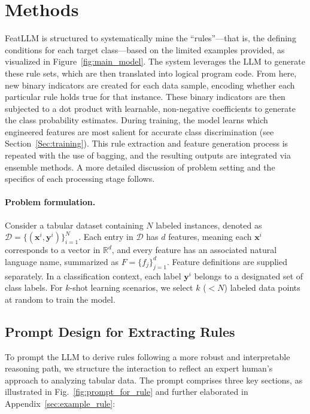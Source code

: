 \section{Methods}
\textsf{FeatLLM} is structured to systematically mine the “rules”—that is, the defining conditions for each target class—based on the limited examples provided, as visualized in Figure~\ref{fig:main_model}. The system leverages the LLM to generate these rule sets, which are then translated into logical program code. From here, new binary indicators are created for each data sample, encoding whether each particular rule holds true for that instance. These binary indicators are then subjected to a dot product with learnable, non-negative coefficients to generate the class probability estimates. During training, the model learns which engineered features are most salient for accurate class discrimination (see Section~\ref{Sec:training}). This rule extraction and feature generation process is repeated with the use of bagging, and the resulting outputs are integrated via ensemble methods. A more detailed discussion of problem setting and the specifics of each processing stage follows.

\vspace*{-0.12in}
\paragraph{Problem formulation.} Consider a tabular dataset containing $N$ labeled instances, denoted as $\mathcal{D} = \{(\mathbf{x}^i, \mathbf{y}^i)\}_{i=1}^{N}$. Each entry in $\mathcal{D}$ has $d$ features, meaning each $\mathbf{x}^i$ corresponds to a vector in $\mathbb{R}^d$, and every feature has an associated natural language name, summarized as $F = \{f_j\}_{j=1}^{d}$. Feature definitions are supplied separately. In a classification context, each label $\mathbf{y}^i$ belongs to a designated set of class labels. For $k$-shot learning scenarios, we select $k$ ($<N$) labeled data points at random to train the model.

\subsection{Prompt Design for Extracting Rules}
\label{Sec:prompt_design}
To prompt the LLM to derive rules following a more robust and interpretable reasoning path, we structure the interaction to reflect an expert human’s approach to analyzing tabular data. The prompt comprises three key sections, as illustrated in Fig.~\ref{fig:prompt_for_rule} and further elaborated in Appendix~\ref{sec:example_rule}:

